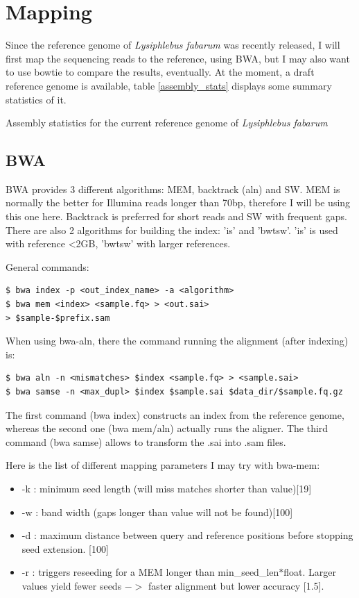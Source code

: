 \documentclass[10pt,a4paper]{report}
\begin{document}
\section{Mapping}
Since the reference genome of \textit{Lysiphlebus fabarum} was recently released, I will first map the sequencing reads to the reference, using BWA, but I may also want to use bowtie to compare the results, eventually. At the moment, a draft reference genome is available, table \ref{assembly_stats} displays some summary statistics of it.
\begin{table}
\vspace{10px}
\caption{Assembly statistics for the current reference genome of \textit{Lysiphlebus fabarum}}
\label{assembly_stats}
\vspace{10px}
\end{table}

\subsection{BWA}

BWA provides 3 different algorithms: MEM, backtrack (aln) and SW. MEM is normally the better for Illumina reads longer than 70bp, therefore I will be using this one here. Backtrack is preferred for short reads and SW with frequent gaps.
There are also 2 algorithms for building the index: 'is' and 'bwtsw'. 'is' is used with reference <2GB, 'bwtsw' with larger references.

General commands: 
\begin{lstlisting}
$ bwa index -p <out_index_name> -a <algorithm>
$ bwa mem <index> <sample.fq> > <out.sai>
> $sample-$prefix.sam
\end{lstlisting}

When using bwa-aln, there the command running the alignment (after indexing) is:
\begin{lstlisting}
$ bwa aln -n <mismatches> $index <sample.fq> > <sample.sai>
$ bwa samse -n <max_dupl> $index $sample.sai $data_dir/$sample.fq.gz
\end{lstlisting}
The first command (bwa index) constructs an index from the reference genome, whereas the second one (bwa mem/aln) actually runs the aligner. The third command (bwa samse) allows to transform the .sai into .sam files.

Here is the list of different mapping parameters I may try with bwa-mem:
\begin{itemize}
\item -k : minimum seed length (will miss matches shorter than value)[19]
\item -w : band width (gaps longer than value will not be found)[100]
\item -d : maximum distance between query and reference positions before stopping seed extension. [100]
\item -r : triggers reseeding for a MEM longer than min\_seed\_len$*$float. Larger values yield fewer seeds $->$ faster alignment but lower accuracy [1.5].
\end{itemize}
\end{document}
